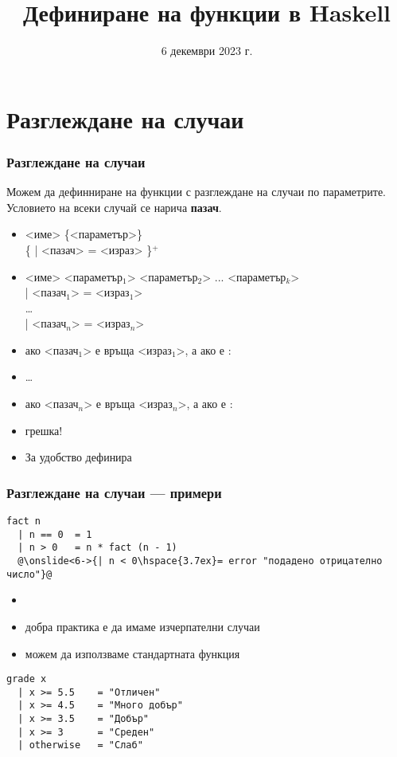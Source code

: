\documentclass[alsotrans]{beamerswitch}
\title{Дефиниране на функции в Haskell}
\date{6 декември 2023 г.}
\begin{document}
\begin{frame}
  \titlepage
\end{frame}

\section{Разглеждане на случаи}

\begin{frame}[fragile]
  \frametitle{Разглеждане на случаи}

  Можем да дефинниране на функции с разглеждане на случаи по параметрите.\\
  Условието на всеки случай се нарича \textbf{пазач}.
  \begin{itemize}
    \item{} <име> \{<параметър>\}\\
      \hspace{3ex} \{ \tta| <пазач> \tta= <израз> \}$^+$
      \pause
    \item{} <име> <параметър$_1$> <параметър$_2$> ... <параметър$_k$>\\
      \hspace{3ex} \tta| <пазач$_1$> \tta= <израз$_1$>\\
      \hspace{3ex} \ldots\\
      \hspace{3ex} \tta| <пазач$_n$> \tta= <израз$_n$>\\
      \pause
    \item ако <пазач$_1$> е  връща <израз$_1$>, а ако е :
    \item \ldots
    \item ако <пазач$_n$> е  връща <израз$_n$>, а ако е :
    \item \alert{грешка!}
      \pause
    \item За удобство  дефинира 
  \end{itemize}
\end{frame}

\begin{frame}[fragile]
  \frametitle{Разглеждане на случаи --- примери}

\begin{lstlisting}
fact n
  | n == 0  = 1
  | n > 0   = n * fact (n - 1)
  @\onslide<6->{| n < 0\hspace{3.7ex}= error "подадено отрицателно число"}@
\end{lstlisting}
\onslide<+->
\begin{itemize}[<+->]
\item {}
\item добра практика е да имаме изчерпателни случаи
\item можем да използваме стандартната функция 
\end{itemize}
\onslide<+->
\onslide<+->
\begin{lstlisting}
grade x
  | x >= 5.5    = "Отличен"
  | x >= 4.5    = "Много добър"
  | x >= 3.5    = "Добър"
  | x >= 3      = "Среден"
  | otherwise   = "Слаб"
\end{lstlisting}
\end{frame}
\end{document}
